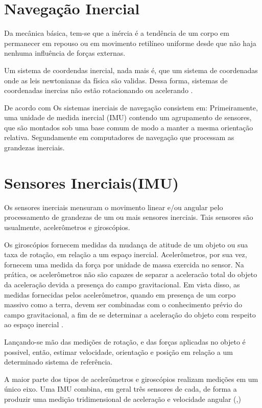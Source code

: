 \section{Navegação Inercial}

Da mecânica básica, tem-se que a inércia é a tendência de um corpo em permanecer em repouso ou em movimento retilíneo uniforme desde que não haja nenhuma influência de forças externas.

Um sistema de coordendas inercial, nada mais é, que um sistema de coordenadas onde as leis newtonianas da física são validas. Dessa forma, sistemas de coordenadas inercias não estão rotacionando ou acelerando \citep{groves2008principles}.

De acordo com \citeauthor{groves2008principles} Os sistemas inerciais de navegação consistem em:
Primeiramente, uma unidade de medida inercial (IMU) contendo um agrupamento de sensores, que são montados sob uma base comum de modo a manter a mesma orientação relativa. Segundamente em computadores de navegação que processam as grandezas inerciais.



\section{Sensores Inerciais(IMU)}

Os sensores inerciais mensuram o movimento linear e/ou angular pelo processamento de grandezas de um ou mais sensores inerciais. Tais sensores são usualmente, acelerômetros e giroscópios.

Os giroscópios fornecem medidas da mudança de atitude de um objeto ou sua taxa de rotação, em relação a um espaço inercial.
Acelerômetros, por sua vez, fornecem uma medida da força por unidade de massa exercida no sensor. Na prática, os acelerômetros não são capazes de separar a aceleracão total do objeto da aceleração devida a presença do campo gravitacional. Em vista disso, as medidas fornecidas pelos acelerômetros, quando em presença de um corpo massivo como a terra, devem ser combinadas com o conhecimento prévio do campo gravitacional, a fim de se determinar a aceleração do objeto com respeito ao espaço inercial \cite{groves2008principles}.

Lançando-se mão das medições de rotação, e das forças aplicadas no objeto é possivel, então, estimar velocidade, orientação e posição em relação a um determinado sistema de referência.

A maior parte dos tipos de acelerômetros e giroscópios realizam medições em um único eixo. Uma IMU combina, em geral três sensores de cada, de forma a produzir uma medição tridimensional de aceleração e velocidade angular (\citeauthor{groves2008principles},\citeyear{groves2008principles})

